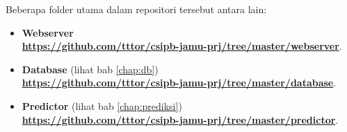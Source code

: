 Beberapa folder utama dalam repositori tersebut antara lain:
\begin{itemize}
\item \textbf{Webserver}\\
\href{https://github.com/tttor/csipb-jamu-prj/tree/master/webserver}{\textbf{https://github.com/tttor/csipb-jamu-prj/tree/master/webserver}}.
\item \textbf{Database} (lihat bab \ref{chap:db})\\
\href{https://github.com/tttor/csipb-jamu-prj/tree/master/database}{\textbf{https://github.com/tttor/csipb-jamu-prj/tree/master/database}}.
\item \textbf{Predictor} (lihat bab \ref{chap:prediksi})\\
\href{https://github.com/tttor/csipb-jamu-prj/tree/master/predictor}{\textbf{https://github.com/tttor/csipb-jamu-prj/tree/master/predictor}}.
\end{itemize}
